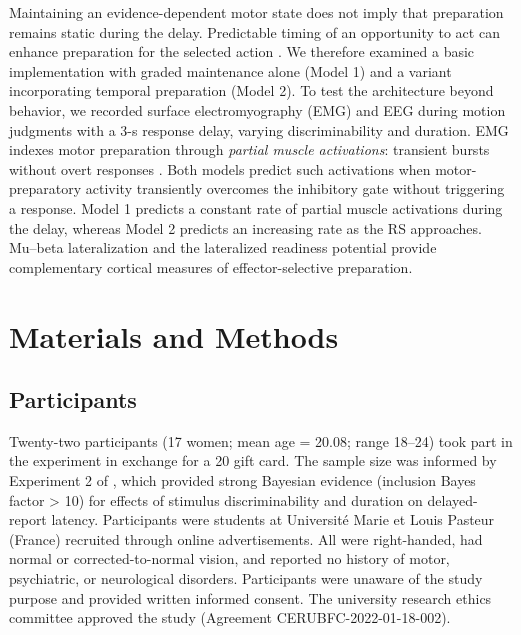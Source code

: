 \documentclass[a4paper,11pt]{article}
\theoremstyle{definition}
\newcommand{\1}{\mathbbm{1}}
\begin{document}
Maintaining an evidence-dependent motor state does not imply that preparation remains static during the delay. Predictable timing of an opportunity to act can enhance preparation for the selected action \parencites{heidemanTemporalAlignmentAnticipatory2018}{liBetaOscillationsInternal2026}. We therefore examined a basic implementation with graded maintenance alone (Model 1) and a variant incorporating temporal preparation (Model 2). To test the architecture beyond behavior, we recorded surface electromyography (EMG) and EEG during motion judgments with a 3-s response delay, varying discriminability and duration. EMG indexes motor preparation through \emph{partial muscle activations}: transient bursts without overt responses \parencites[e.g.,][]{colesPsychophysiologicalInvestigationContinuous}{servantUsingCovertResponse2015}. Both models predict such activations when motor-preparatory activity transiently overcomes the inhibitory gate without triggering a response. Model 1 predicts a constant rate of partial muscle activations during the delay, whereas Model 2 predicts an increasing rate as the RS approaches. Mu--beta lateralization and the lateralized readiness potential provide complementary cortical measures of effector-selective preparation.


\section{Materials and Methods}


\subsection{Participants}

Twenty-two participants (17 women; mean age = 20.08; range 18--24) took part in the experiment in exchange for a \texteuro{}20 gift card. The sample size was informed by Experiment 2 of \textcite{achardExtendingContinuousFlow2025}, which provided strong Bayesian evidence (inclusion Bayes factor > 10) for effects of stimulus discriminability and duration on delayed-report latency. Participants were students at Universit\'e Marie et Louis Pasteur (France) recruited through online advertisements. All were right-handed, had normal or corrected-to-normal vision, and reported no history of motor, psychiatric, or neurological disorders. Participants were unaware of the study purpose and provided written informed consent. The university research ethics committee approved the study (Agreement CERUBFC-2022-01-18-002).
\end{document}
